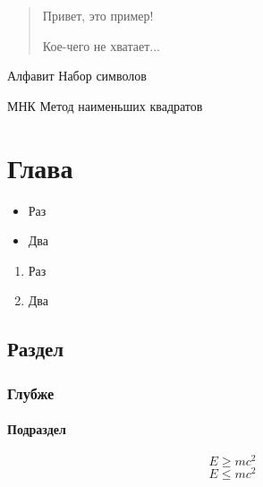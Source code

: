 \documentclass[12pt, rusmathsym]{nirreportnew}
\begin{document}
\titlepage

\begin{abstract}
	Привет, это пример!

	Кое-чего не хватает...
\end{abstract}

\begin{executors}
\end{executors}

\tableofcontents

\begin{nirdefslist}
	\item[Алфавит] Набор символов
\end{nirdefslist}

\begin{nirabbrlist}
	\item[МНК] Метод наименьших квадратов
\end{nirabbrlist}

\chapter{Глава}

\begin{itemize}
	\item Раз
	\item Два
\end{itemize}

\begin{enumerate}
	\item Раз
	\item Два
\end{enumerate}

\lipsum[1]

\section{Раздел}

\lipsum[1]

\subsection{Глубже}

\lipsum[1]

\subsubsection{Подраздел}

\lipsum[1]
\begin{equation}
	E \geq mc^2
\end{equation}
\begin{equation}
	E \leq mc^2
\end{equation}
\lipsum[1]
\end{document}
